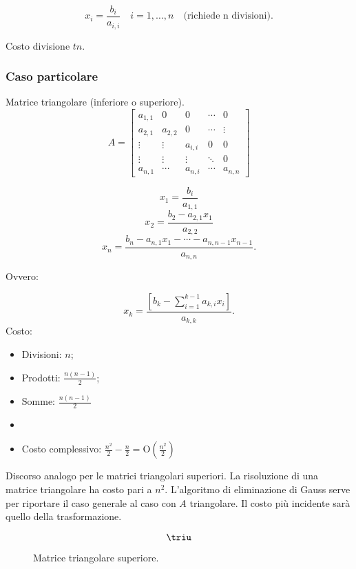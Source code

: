 \[x_i = \frac{b_i}{a_{i,i}}\quad i = 1, \ldots, n \quad
\textrm{(richiede n divisioni).}\]

Costo divisione $tn$.

\subsubsection*{Caso particolare} %
Matrice triangolare (inferiore o superiore).
\[
A = \left[ \begin{array}{ccccc}
a_{1,1} & 0 & 0 & \cdots & 0 \\
a_{2,1} & a_{2,2}& 0 & \cdots & \vdots \\
\vdots & \vdots & a_{i,i} & 0 & 0 \\
\vdots & \vdots & \vdots & \ddots & 0 \\
a_{n,1} & \cdots & a_{n,i} & \cdots & a_{n,n}
\end{array} \right]
\]

\[
x_1 = \frac{b_i}{a_{1,1}}\]\[ x_2 = \frac{b_2 - a_{2,1}x_1}{a_{2,2}}\]\[ x_n =
\frac{b_n - a_{n,1}x_1 - \cdots -a_{n,n-1}x_{n-1}}{a_{n,n}}.
\]

Ovvero:

\[
x_k = \frac{\left[b_k -\sum_{i = 1}^{k-1}a_{k,i}x_i\right]}{a_{k,k}}.
\]
Costo:
\begin{itemize}
\item[]Divisioni: $n$;
\item[]Prodotti: $\frac{n(n-1)}{2}$;
\item[]Somme: $\frac{n(n-1)}{2}$
\item[]
\item[]Costo complessivo: $\frac{n^2}{2} - \frac{n}{2} =
\textrm{O}(\frac{n^2}{2})$
\end{itemize}
Discorso analogo per le matrici triangolari superiori. La risoluzione di una
matrice triangolare ha costo pari a $n^2$. L'algoritmo di eliminazione di Gauss
serve per riportare il caso generale al caso con $A$ triangolare. Il costo
più incidente sarà quello della trasformazione.

\begin{figure}
\[
\triu
\]
\caption{Matrice triangolare superiore.}
\end{figure}

